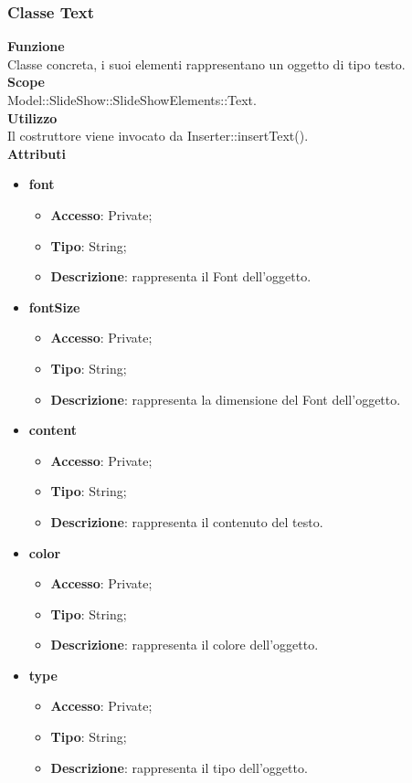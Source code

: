 {		\subsubsection{Classe Text}{
			\label{Text}
			\textbf{Funzione}\\
				\indent Classe concreta, i suoi elementi rappresentano un oggetto di tipo testo.\\
		   	\textbf{Scope}\\
				\indent Model::SlideShow::SlideShowElements::Text.\\
			\textbf{Utilizzo}\\
				\indent Il costruttore viene invocato da Inserter::insertText().\\
			\textbf{Attributi}
			\begin{itemize}
				\item \textbf{font}
				\begin{itemize}
					\item \textbf{Accesso}: Private;
					\item \textbf{Tipo}: String;
					\item \textbf{Descrizione}: rappresenta il Font dell’oggetto.
				\end{itemize}
				\item \textbf{fontSize}
				\begin{itemize}
					\item \textbf{Accesso}: Private;
					\item \textbf{Tipo}: String;
					\item \textbf{Descrizione}: rappresenta la dimensione del Font dell’oggetto.
				\end{itemize}
				\item \textbf{content}
				\begin{itemize}
					\item \textbf{Accesso}: Private;
					\item \textbf{Tipo}: String;
					\item \textbf{Descrizione}: rappresenta il contenuto del testo.
				\end{itemize}
				\item \textbf{color}
				\begin{itemize}
					\item \textbf{Accesso}: Private;
					\item \textbf{Tipo}: String;
					\item \textbf{Descrizione}: rappresenta il colore dell’oggetto.
				\end{itemize}
				\item \textbf{type}
				\begin{itemize}
					\item \textbf{Accesso}: Private;
					\item \textbf{Tipo}: String;
					\item \textbf{Descrizione}: rappresenta il tipo dell'oggetto.
				\end{itemize}
			\end{itemize}
		}
}
